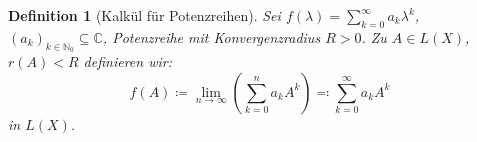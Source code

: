 \documentclass[12pt]{extreport} %
\newcommand{\C}{\mathbb{C}}
\newcommand{\N}{\mathbb{N}}
\theoremstyle{named}
\theoremstyle{nnamed}
\theoremstyle{itshape}
\newtheorem{definition}{Definition}  \counterwithin{definition}{chapter}
\theoremstyle{normal}
\begin{document}
\begin{definition}[Kalkül für Potenzreihen]
	Sei $f(\lambda) = \sum_{k=0}^{\infty} a_k \lambda^k$, $\left( a_k \right)_{k \in \N_0} \subseteq \C$, Potenzreihe mit Konvergenzradius $R > 0$. Zu $A \in L(X)$, $r(A) < R$ definieren wir:
	$$ f(A) \coloneqq \lim_{n \rightarrow \infty} \left( \sum_{k = 0}^{n} a_k A^k \right) \eqqcolon \sum_{k =0}^{\infty} a_k A^{k} $$
	in $L(X)$.
\end{definition}



\renewcommand{\indexname}{Stichwortverzeichnis}
\printindex
\end{document}
